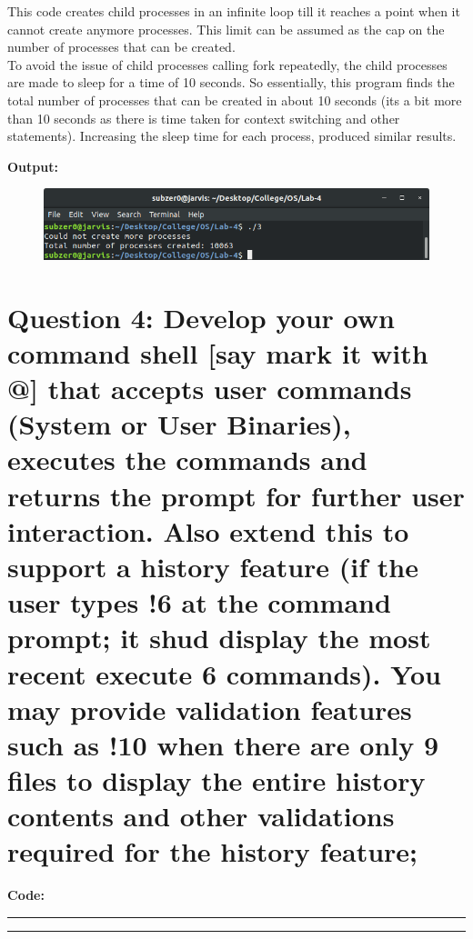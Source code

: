 \documentclass{article}
\begin{document}
	This code creates child processes in an infinite loop till 
	it reaches a point when it cannot create anymore processes.
	This limit can be assumed as the cap on the number of processes
	that can be created. \\

	To avoid the issue of child processes calling fork repeatedly,
	the child processes are made to sleep for a time of 10 seconds.
	So essentially, this program finds the total number of processes
	that can be created in about 10 seconds (its a bit more than 10
	seconds as there is time taken for context switching and other 
	statements). Increasing the sleep time for each process, produced
	similar results.

\bigskip
\noindent
\textbf{\Large Output:}

\begin{figure}[h]
	\includegraphics[width=\textwidth]{output/3.png}
\end{figure}
\bigskip

\section*{Question 4: Develop your own command shell [say mark it with @] that accepts user commands (System or User Binaries), executes the commands and returns the prompt for further user interaction. Also extend this to support a history feature (if the user types !6 at the command prompt; it shud display the most recent execute 6 commands). You may provide validation features such as !10 when there are only 9 files to display the entire history contents and other validations required for the history feature;}
\bigskip

\textbf{\Large Code:}
\smallskip
\par\noindent\rule{\textwidth}{0.4pt}

\par\noindent\rule{\textwidth}{0.4pt}
\end{document}
